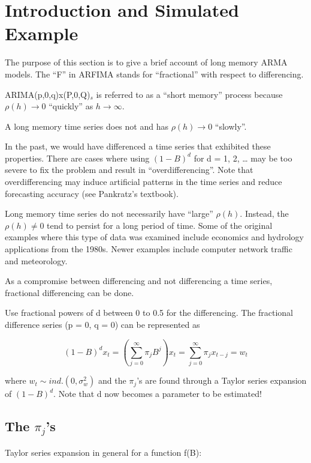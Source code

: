 \documentclass[
]{book}
\theoremstyle{definition}
\theoremstyle{definition}
\theoremstyle{definition}
\theoremstyle{definition}
\theoremstyle{remark}
\begin{document}
\hypertarget{introduction-and-simulated-example-1}{%
\section{Introduction and Simulated Example}\label{introduction-and-simulated-example-1}}

The purpose of this section is to give a brief account of long memory ARMA models. The ``F'' in ARFIMA stands for ``fractional'' with respect to differencing.

ARIMA(p,0,q)x(P,0,Q)\(_s\) is referred to as a ``short memory'' process because \(\rho(h)\to0\) ``quickly'' as \(h \to \infty\).

A long memory time series does not and has \(\rho(h)\to 0\) ``slowly''.

In the past, we would have differenced a time series that exhibited these properties. There are cases where using \((1-B)^d\) for d = 1, 2, \ldots{} may be too severe to fix the problem and result in ``overdifferencing''. Note that overdifferencing may induce artificial patterns in the time series and reduce forecasting accuracy (see Pankratz's textbook).

Long memory time series do not necessarily have ``large'' \(\rho(h)\). Instead, the \(\rho(h) \ne 0\) tend to persist for a long period of time. Some of the original examples where this type of data was examined include economics and hydrology applications from the 1980s. Newer examples include computer network traffic and meteorology.

As a compromise between differencing and not differencing a time series, fractional differencing can be done.

Use fractional powers of d between 0 to 0.5 for the differencing. The fractional difference series (p = 0, q = 0) can be represented as

\[(1-B)^dx_t=(\sum_{j=0}^{\infty}\pi_jB^j)x_t=\sum_{j=0}^{\infty}\pi_jx_{t-j}=w_t\]

where \(w_t\sim ind.(0, \sigma_w^2)\) and the \(\pi_j\)'s are found through a Taylor series expansion of \((1-B)^d\). Note that d now becomes a parameter to be estimated!

\hypertarget{the-pi_js}{%
\subsection{\texorpdfstring{The \(\pi_j\)'s}{The \textbackslash pi\_j's}}\label{the-pi_js}}

Taylor series expansion in general for a function f(B):
\end{document}
